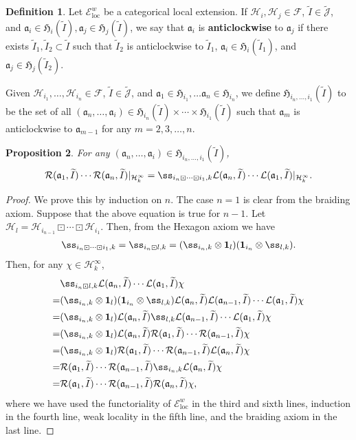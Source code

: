 \documentclass[12pt,a4paper]{article}
\theoremstyle{definition}
\newtheorem{df}{Definition}[subsection]
\theoremstyle{plain}
\newtheorem{pp}[df]{Proposition}
\newcommand{\fk}{\mathfrak}
\newcommand{\mc}{\mathcal}
\newcommand{\wtd}{\widetilde}
\newcommand{\id}{\mathbf{1}}
\newcommand{\loc}{\mathrm{loc}}
\newcommand{\scr}{\mathscr}
\newcommand{\Jtd}{\widetilde{\mathcal J}}
\numberwithin{equation}{subsection}
\begin{document}
\begin{df}
Let $\scr E^w_\loc$ be a categorical local extension. If $\mc H_i,\mc H_j\in\mc F$, $\wtd I\in\Jtd$, and $\fk a_i\in\fk H_i(\wtd I),\fk a_j\in\fk H_j(\wtd I)$, we say that $\fk a_i$ is \textbf{anticlockwise} to $\fk a_j$ if there exists $\wtd I_1,\wtd I_2\subset\wtd I$ such that $\wtd I_2$ is anticlockwise to $\wtd I_1$, $\fk a_i\in\fk H_i(\wtd I_1)$, and $\fk a_j\in\fk H_j(\wtd I_2)$.

Given $\mc H_{i_1},\dots,\mc H_{i_n}\in\mc F$, $\wtd I\in\Jtd$, and $\fk a_1\in\fk H_{i_1},\dots \fk a_n\in\fk H_{i_n}$, we define $\fk H_{i_n,\dots,i_1}(\wtd I)$ to be the set of all $(\fk a_n,\dots,\fk a_i)\in\fk H_{i_n}(\wtd I)\times\cdots\times\fk H_{i_1}(\wtd I)$ such that $\fk a_m$ is anticlockwise to $\fk a_{m-1}$ for any $m=2,3,\dots,n$.
\end{df}

\begin{pp}\label{lb32}
For any $(\fk a_n,\dots,\fk a_i)\in \fk H_{i_n,\dots,i_1}(\wtd I)$,
\begin{align}
\mc R(\fk a_1,\wtd I)\cdots\mc R(\fk a_n,\wtd I)|_{\mc H_k^\infty}=\ss_{i_n\boxdot\cdots\boxdot i_1,k}\mc L(\fk a_n,\wtd I)\cdots\mc L(\fk a_1,\wtd I)|_{\mc H_k^\infty}.
\end{align}
\end{pp}

\begin{proof}
We prove this by induction on $n$. The case $n=1$ is clear from the braiding axiom. Suppose that the above equation is true for $n-1$. Let $\mc H_l=\mc H_{i_{n-1}}\boxdot\cdots\boxdot\mc H_{i_1}$. Then, from the Hexagon axiom we have
\begin{align*}
\ss_{i_n\boxdot\cdots\boxdot i_1,k}=\ss_{i_n\boxdot l,k}=(\ss_{i_n,k}\otimes\id_l)(\id_{i_n}\otimes\ss_{l,k}).
\end{align*}
Then, for any $\chi\in\mc H_k^\infty$,
\begin{align*}
&\ss_{i_n\boxdot l,k}\mc L(\fk a_n,\wtd I)\cdots\mc L(\fk a_1,\wtd I)\chi\\
=&(\ss_{i_n,k}\otimes\id_l)(\id_{i_n}\otimes\ss_{l,k})\mc L(\fk a_n,\wtd I)\mc L(\fk a_{n-1},\wtd I)\cdots\mc L(\fk a_1,\wtd I)\chi\\
=& (\ss_{i_n,k}\otimes\id_l)\mc L(\fk a_n,\wtd I)\ss_{l,k}\mc L(\fk a_{n-1},\wtd I)\cdots\mc L(\fk a_1,\wtd I)\chi\\
=&(\ss_{i_n,k}\otimes\id_l)\mc L(\fk a_n,\wtd I)\mc R(\fk a_1,\wtd I)\cdots\mc R(\fk a_{n-1},\wtd I)\chi\\
=&(\ss_{i_n,k}\otimes\id_l)\mc R(\fk a_1,\wtd I)\cdots\mc R(\fk a_{n-1},\wtd I)\mc L(\fk a_n,\wtd I)\chi\\
=&\mc R(\fk a_1,\wtd I)\cdots\mc R(\fk a_{n-1},\wtd I)\ss_{i_n,k}\mc L(\fk a_n,\wtd I)\chi\\
=&\mc R(\fk a_1,\wtd I)\cdots\mc R(\fk a_{n-1},\wtd I)\mc R(\fk a_n,\wtd I)\chi,
\end{align*}
where we have used the functoriality of $\scr E^w_\loc$ in the third and sixth lines, induction in the fourth line,  weak locality in the fifth line, and the braiding axiom in the last line.
\end{proof}
\end{document}
